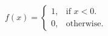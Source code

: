 \documentclass{article}
\begin{document}
\begin{equation}
  f(x)=\begin{cases}
    1, & \text{if $x<0$}.\\
    0, & \text{otherwise}.
  \end{cases}
\end{equation}
\end{document}
